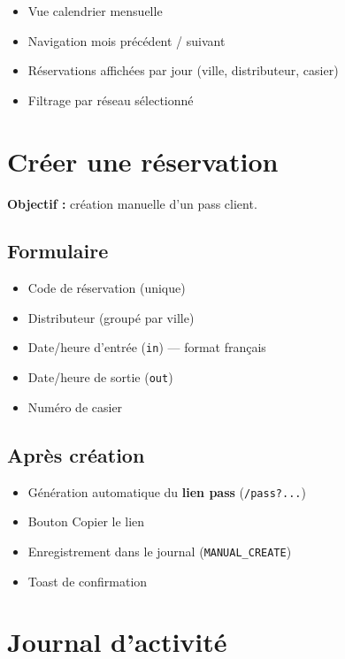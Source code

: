 \documentclass[11pt,a4paper]{article}
\begin{document}
\begin{itemize}[noitemsep]
  \item Vue calendrier mensuelle
  \item Navigation mois précédent / suivant
  \item Réservations affichées par jour (ville, distributeur, casier)
  \item Filtrage par réseau sélectionné
\end{itemize}

\section{Créer une réservation}

\textbf{Objectif :} création manuelle d'un pass client.

\subsection{Formulaire}
\begin{itemize}[noitemsep]
  \item Code de réservation (unique)
  \item Distributeur (groupé par ville)
  \item Date/heure d'entrée (\texttt{in}) — format français
  \item Date/heure de sortie (\texttt{out})
  \item Numéro de casier
\end{itemize}

\subsection{Après création}
\begin{itemize}[noitemsep]
  \item Génération automatique du \textbf{lien pass} (\texttt{/pass?...})
  \item Bouton \og Copier le lien \fg{}
  \item Enregistrement dans le journal (\texttt{MANUAL\_CREATE})
  \item Toast de confirmation
\end{itemize}

\section{Journal d'activité}
\end{document}

